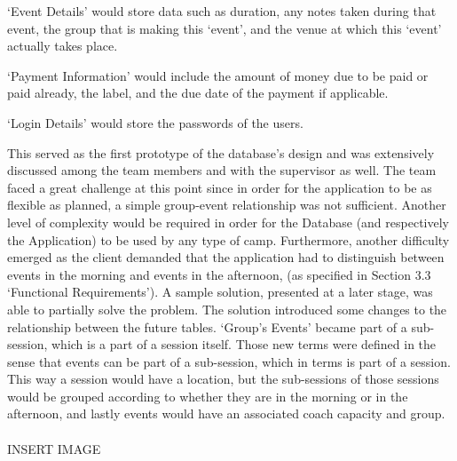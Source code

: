 \documentclass{l3proj}
\begin{document}
\par 
`Event Details' would store data such as duration, any notes taken during that event, the group that is making this `event', and the venue at which this ‘event’ actually takes place.\\
\par 
`Payment Information' would include the amount of money due to be paid or paid already, the label, and the due date of the payment if applicable.\\
\par 
`Login Details' would store the passwords of the users.\\
\par 
This served as the first prototype of the database’s design and was extensively discussed among the team members and with the supervisor as well. The team faced a great challenge at this point since in order for the application to be as flexible as planned, a simple group-event relationship was not sufficient. Another level of complexity would be required in order for the Database (and respectively the Application) to be used by any type of camp. Furthermore, another difficulty emerged as the client demanded that the application had to distinguish between events in the morning and events in the afternoon, (as specified in Section 3.3 `Functional Requirements'). A sample solution, presented at a later stage, was able to partially solve the problem. The solution introduced some changes to the relationship between the future tables. `Group’s Events' became part of a sub-session, which is a part of a session itself. Those new terms were defined in the sense that events can be part of a sub-session, which in terms is part of a session. This way a session would have a location, but the sub-sessions of those sessions would be grouped according to whether they are in the morning or in the afternoon, and lastly events would have an associated coach capacity and group.\\
\\
{\LARGE{INSERT IMAGE}}\\
\par
\end{document}
